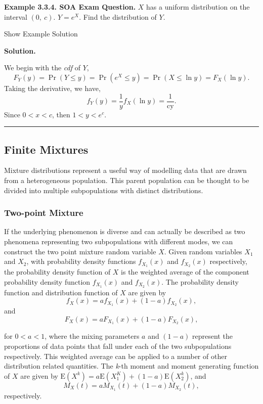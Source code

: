 \documentclass[]{book}
\theoremstyle{definition}
\theoremstyle{definition}
\theoremstyle{definition}
\theoremstyle{remark}
\begin{document}
\textbf{Example 3.3.4. SOA Exam Question.} \(X\) has a uniform
distribution on the interval \((0,\ c)\). \(Y = e^{X}\). Find the
distribution of \(Y\).

Show Example Solution

\hypertarget{toggleExampleLoss.3.4}{}
\textbf{Solution.}

We begin with the \emph{cdf} of \(Y\),
\[F_{Y}\left( y \right) = \Pr\left( Y \leq y \right) = \Pr\left( e^{X} \leq y \right) = \Pr\left( X \leq \ln y \right) = F_{X}\left( \ln y \right).\]
Taking the derivative, we have,
\[f_{Y}\left( y \right) = \frac{1}{y}f_{X}\left(\ln y \right) = \frac{1}{\text{cy}}. \]
Since \(0 < x < c\), then \(1 < y < e^{c}\).

\begin{center}\rule{0.5\linewidth}{\linethickness}\end{center}

\subsection{Finite Mixtures}\label{finite-mixtures}

Mixture distributions represent a useful way of modelling data that are
drawn from a heterogeneous population. This parent population can be
thought to be divided into multiple subpopulations with distinct
distributions.

\subsubsection{Two-point Mixture}\label{two-point-mixture}

If the underlying phenomenon is diverse and can actually be described as
two phenomena representing two subpopulations with different modes, we
can construct the two point mixture random variable \(X\). Given random
variables \(X_{1}\) and \(X_{2}\), with probability density functions
\(f_{X_{1}}\left( x \right)\) and \(f_{X_{2}}\left( x \right)\)
respectively, the probability density function of \(X\) is the weighted
average of the component probability density function
\(f_{X_{1}}\left( x \right)\) and \(f_{X_{2}}\left( x \right)\). The
probability density function and distribution function of \(X\) are
given by
\[f_{X}\left( x \right) = af_{X_{1}}\left( x \right) + \left( 1 - a \right)f_{X_{2}}\left( x \right),\]
and
\[F_{X}\left( x \right) = aF_{X_{1}}\left( x \right) + \left( 1 - a \right)F_{X_{2}}\left( x \right),\]

for \(0 < a <1\), where the mixing parameters \(a\) and \((1 - a)\)
represent the proportions of data points that fall under each of the two
subpopulations respectively. This weighted average can be applied to a
number of other distribution related quantities. The \emph{k}-th moment
and moment generating function of \(X\) are given by
\(\mathrm{E}\left( X^{k} \right) = a\mathrm{E}\left( X_{1}^{K} \right) + \left( 1 - a \right)\mathrm{E}\left( X_{2}^{k} \right)\),
and
\[M_{X}\left( t \right) = aM_{X_{1}}\left( t \right) + \left( 1 - a \right)M_{X_{2}}\left( t \right),\]
respectively.
\end{document}
